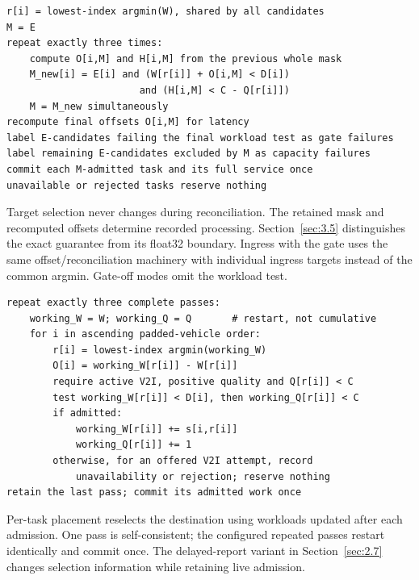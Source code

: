 \documentclass[12pt,a4paper]{article}
\begin{document}
\begin{algorithm}[htbp]
\caption{common-target placement with gate (one substep)}\label{alg:1}
\begin{Verbatim}[fontsize=\small,breaklines=true]
r[i] = lowest-index argmin(W), shared by all candidates
M = E
repeat exactly three times:
    compute O[i,M] and H[i,M] from the previous whole mask
    M_new[i] = E[i] and (W[r[i]] + O[i,M] < D[i])
                       and (H[i,M] < C - Q[r[i]])
    M = M_new simultaneously
recompute final offsets O[i,M] for latency
label E-candidates failing the final workload test as gate failures
label remaining E-candidates excluded by M as capacity failures
commit each M-admitted task and its full service once
unavailable or rejected tasks reserve nothing
\end{Verbatim}
\end{algorithm}

Target selection never changes during reconciliation. The retained mask and recomputed offsets determine recorded processing. Section~\ref{sec:3.5} distinguishes the exact guarantee from its float32 boundary. Ingress with the gate uses the same offset/reconciliation machinery with individual ingress targets instead of the common argmin. Gate-off modes omit the workload test.

\begin{algorithm}[htbp]
\caption{causal per-task placement with gate (one substep)}\label{alg:2}
\begin{Verbatim}[fontsize=\small,breaklines=true]
repeat exactly three complete passes:
    working_W = W; working_Q = Q       # restart, not cumulative
    for i in ascending padded-vehicle order:
        r[i] = lowest-index argmin(working_W)
        O[i] = working_W[r[i]] - W[r[i]]
        require active V2I, positive quality and Q[r[i]] < C
        test working_W[r[i]] < D[i], then working_Q[r[i]] < C
        if admitted:
            working_W[r[i]] += s[i,r[i]]
            working_Q[r[i]] += 1
        otherwise, for an offered V2I attempt, record
            unavailability or rejection; reserve nothing
retain the last pass; commit its admitted work once
\end{Verbatim}
\end{algorithm}

Per-task placement reselects the destination using workloads updated after each admission. One pass is self-consistent; the configured repeated passes restart identically and commit once. The delayed-report variant in Section~\ref{sec:2.7} changes selection information while retaining live admission.
\end{document}
